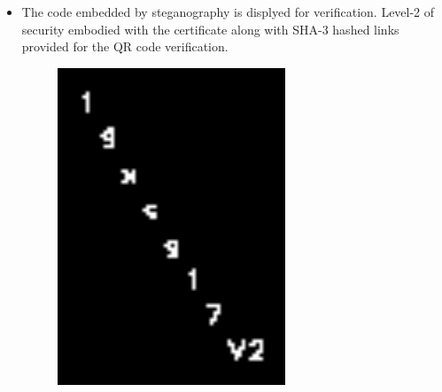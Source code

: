 \begin{itemize}
	\item The code embedded by steganography is displyed for verification. Level-2 of security embodied with the certificate along with SHA-3 hashed links provided for the QR code verification.
\begin{figure}[H]
	\centering
	\includegraphics[width=0.4\linewidth]{"images/generation_qr_nqr/Screenshot (83)"}
	\label{fig:screenshot-83}
\end{figure}


\end{itemize}